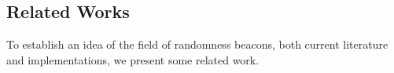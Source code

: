 \subsection{Related Works}%
\label{sub:related_works}
To establish an idea of the field of randomness beacons, both current literature and implementations, we present some related work.
